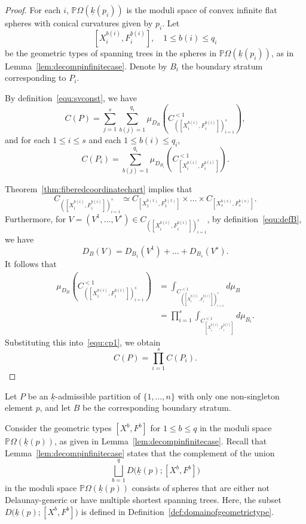 \documentclass{compositio}
\numberwithin{equation}{section}
\numberwithin{figure}{section}
\theoremstyle{definition}
\theoremstyle{plain}
\begin{document}
{\begin{proof}
    For each $i$, $\mathbb{P}\Omega(\underline{k}(p_i))$ is the moduli space of convex infinite flat spheres with conical curvatures given by $p_i$. Let
    $$
    [X_i^{b(i)}, F_i^{b(i)}],\quad 1\le b(i)\le q_i
    $$
    be the geometric types of spanning trees in the spheres in $\mathbb{P}\Omega(\underline{k}(p_i))$, as in Lemma~\ref{lem:decompinfinitecase}. Denote by $B_i$ the boundary stratum corresponding to $P_i$.

    By definition~\eqref{equ:svconst}, we have
    \begin{equation}\label{equ:cp1}
        C(P) = \sum_{j=1}^{s}\sum_{b(j)=1}^{q_i} \mu_{D_B}\left(C^{< 1}_{([X^{b(i)}_i, F^{b(i)}_i])_{i=1}^s}\right),
    \end{equation}
    and for each $1\le i\le s$ and each $1\le b(i)\le q_i$,
    $$
    C(P_i) = \sum_{b(j)=1}^{q_i} \mu_{D_{B_i}}\left(C^{< 1}_{[X^{b(i)}_i, F^{b(i)}_i]}\right).
    $$

    Theorem~\ref{thm:fiberedcoordinatechart} implies that
    $$
    C_{([X^{b(i)}_i, F^{b(i)}_i])_{i=1}^s}\simeq C_{[X^{b(1)}_1, F^{b(1)}_1]}\times\ldots\times C_{[X^{b(s)}_s, F^{b(s)}_s]}.
    $$
    Furthermore, for $V=(V^1,\ldots,V^s)\in C_{([X^{b(i)}_i, F^{b(i)}_i])_{i=1}^s}$, by definition~\eqref{equ:defB}, we have
    $$
    D_B(V) = D_{B_1}(V^1) + \ldots + D_{B_s}(V^s).
    $$
    It follows that
    \begin{align*}
        \mu_{D_B}\left(C^{< 1}_{([X^{b(i)}_i, F^{b(i)}_i])_{i=1}^s}\right) &= \int_{C^{< 1}_{([X^{b(i)}_i, F^{b(i)}_i])_{i=1}^s}} d\mu_B\\
        &= \prod_{i=1}^s \int_{C^{< 1}_{[X^{b(i)}_i, F^{b(i)}_i]}} d\mu_{B_i}.
    \end{align*}
    Substituting this into~\eqref{equ:cp1}, we obtain
    $$
    C(P) = \prod_{i=1}^{s} C(P_i).
    $$
\end{proof}


Let $P$ be an $\underline{k}$-admissible partition of $\{1,\ldots,n\}$ with only one non-singleton element $p$, and let $B$ be the corresponding boundary stratum.

Consider the geometric types $[X^b,F^b]$ for $1\le b \le q$ in the moduli space $\mathbb{P}\Omega(\underline{k}(p))$, as given in Lemma~\ref{lem:decompinfinitecase}. Recall that Lemma~\ref{lem:decompinfinitecase} states that the complement of the union
$$
\bigsqcup_{b=1}^q D\Big(\underline{k}(p);[X^b, F^b]\Big)
$$
in the moduli space $\mathbb{P}\Omega(\underline{k}(p))$ consists of spheres that are either not Delaunay-generic or have multiple shortest spanning trees. Here, the subset $D\Big(\underline{k}(p);[X^b, F^b]\Big)$ is defined in Definition~\ref{def:domainofgeometrictype}.

}
\end{document}
